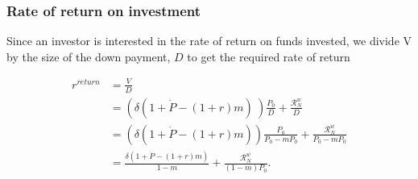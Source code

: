 \subsubsection{Rate of return on investment}
Since an investor is interested in the rate of return on funds invested, we divide V by the size of the down payment, $D$ to get the required rate of return  

\begin{align}
r^{return} 
  &= \frac{V}{D}  \nonumber \\
  &= \left(\delta \left(1+\dot P - (1+r)m\right) \ \right) \frac{P_0}{D}  + \frac{\mathcal{R}^w_N }{D}      \nonumber \\
  &= \left(\delta \left(1+\dot P - (1+r)m\right)  \right) \frac{P_0}{P_0-mP_0} +  \frac{\mathcal{R}^w_N }{P_0-mP_0}  \\ 
  &= \frac{\delta \left(1+\dot P - (1+r)m\right) }{1-m} +\frac{\mathcal{R}^w_N }{(1-m)P_0}.
\label{eqn-property-investment-return1}
\end{align}


